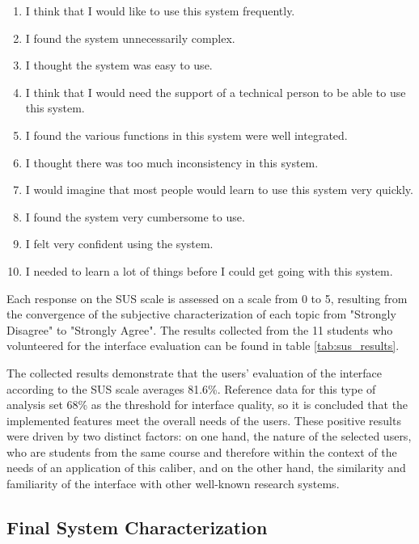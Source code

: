 \documentclass[sigconf]{acmart}
\begin{document}
\begin{enumerate}

    \renewcommand{\labelenumi}{\arabic{enumi}.}
    \item I think that I would like to use this system frequently.
    \item I found the system unnecessarily complex.
    \item I thought the system was easy to use.
    \item I think that I would need the support of a technical person to be able to use this system.
    \item I found the various functions in this system were well integrated.
    \item I thought there was too much inconsistency in this system.
    \item I would imagine that most people would learn to use this system very quickly.
    \item I found the system very cumbersome to use.
    \item I felt very confident using the system.
    \item I needed to learn a lot of things before I could get going with this system.
\end{enumerate}


Each response on the SUS scale is assessed on a scale from 0 to 5, resulting from the convergence of the subjective characterization of each topic from "Strongly Disagree" to "Strongly Agree". The results collected from the 11 students who volunteered for the interface evaluation can be found in table \ref{tab:sus_results}.

The collected results demonstrate that the users' evaluation of the interface according to the SUS scale averages 81.6\%. Reference data for this type of analysis set 68\% as the threshold for interface quality, so it is concluded that the implemented features meet the overall needs of the users. These positive results were driven by two distinct factors: on one hand, the nature of the selected users, who are students from the same course and therefore within the context of the needs of an application of this caliber, and on the other hand, the similarity and familiarity of the interface with other well-known research systems.

\subsection{Final System Characterization}
\end{document}
